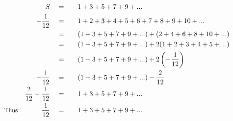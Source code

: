 \begin{alignat*}{5}
&\,&S\quad&=\quad&&1+3+5+7+9+...\\
&\,&-\frac{1}{12}\quad&=&&1+2+3+4+5+6+7+8+9+10+...\\
&\,&\,&=&&(1+3+5+7+9+...)+(2+4+6+8+10+...)\\
&\,&\,&=&&(1+3+5+7+9+...)+2(1+2+3+4+5+...)\\
&\,&\,&=&&(1+3+5+7+9+...)+2\left(-\frac{1}{12}\right)\\
&\,&-\frac{1}{12}\quad&=&&(1+3+5+7+9+...)-\frac{2}{12}\\
&\,&\frac{2}{12}-\frac{1}{12}\quad&=&&1+3+5+7+9+...\\
&\small\text{Thus}&\frac{1}{12}\quad&=&&1+3+5+7+9+...
\end{alignat*}
